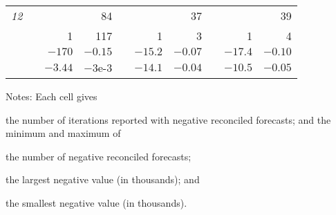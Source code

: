 \documentclass[11pt]{article}
\newcommand{\0}{\phantom{0}}
\begin{document}
\begin{table}[!htbp]
\begin{threeparttable}
\begin{tabular}{lrrrrrrrrr}
			{\it 12} &  &                           & 84      &                               &         & 37                       &  &          & 39      \\
			         &  & 1                         & 117     &                               & 1       & 3                        &  & 1        & 4       \\
			         &  & $-170$                    & $-0.15$ &                               & $-15.2$ & $-0.07$                  &  & $-17.4$  & $-0.10$ \\
			         &  & $-3.44$                   & $-3$e-3 &                               & $-14.1$ & $-0.04$                  &  & $-10.5$  & $-0.05$ \\
			\bottomrule
		\end{tabular}
		\begin{tablenotes}
			\item [] Notes: Each cell gives \begin{inparaenum}[(i)] \item the number of iterations reported with negative reconciled forecasts; and the minimum and maximum of \item the number of negative reconciled forecasts; \item the largest negative value (in thousands); and \item the smallest negative value (in thousands). \end{inparaenum}
		\end{tablenotes}
	\end{threeparttable}
\end{table}
\end{document}

